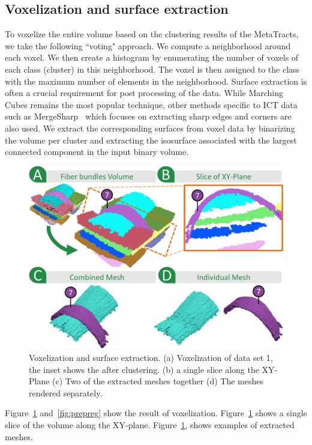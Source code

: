 \subsection{Voxelization and surface extraction}\label{subsec:voxel_surf_extraction}
To voxelize the entire volume based on the clustering results of the MetaTracts, we take the following ``voting" approach.
We compute a neighborhood around each voxel. We then create a histogram by  enumerating the number of voxels of each class (cluster) in this neighborhood. The voxel is then assigned to the class with the maximum number of elements in the neighborhood. 
Surface extraction is often a crucial requirement for post processing of the data. While Marching Cubes\cite{Lorensen1987} remains the most popular technique, other methods specific to ICT data such as MergeSharp~\cite{Bhattacharya2013} which focuses on extracting sharp edges and corners are also used.  
We extract the corresponding surfaces from voxel data by binarizing the volume per cluster and extracting the isosurface associated with the largest connected component in the input binary volume. 
\begin{figure}[htb]
	\centering
	\includegraphics[width=\linewidth]{images/figure8.eps} 
	\caption{Voxelization and surface extraction. (a) Voxelization of data set 1, the inset shows the \mt after clustering. (b) a single slice along the XY-Plane (c) Two of the extracted meshes together (d) The meshes rendered separately.}
	\label{fig:crop-16-decomp}
\end{figure} 
Figure~\ref{fig:crop-16-decomp} and~\ref{fig:prepreg} show the result of voxelization. Figure~\ref{fig:crop-16-decomp} shows a single slice of the volume along the XY-plane. Figure~\ref{fig:crop-16-decomp}, shows examples of extracted meshes.


